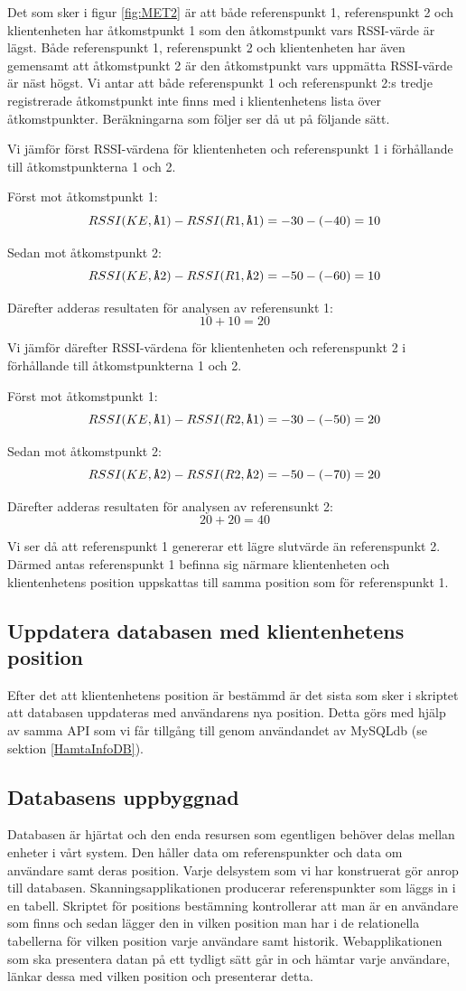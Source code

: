 \documentclass[swedish, a4paper,12pt]{article}
\begin{document}
Det som sker i figur \ref{fig:MET2} är att både referenspunkt 1, referenspunkt 2 och klientenheten har åtkomstpunkt 1 som den åtkomstpunkt vars RSSI-värde är lägst.
Både referenspunkt 1, referenspunkt 2 och klientenheten har även gemensamt att åtkomstpunkt 2 är den åtkomstpunkt vars uppmätta RSSI-värde är näst högst.
Vi antar att både referenspunkt 1 och referenspunkt 2:s tredje registrerade åtkomstpunkt inte finns med i klientenhetens lista över åtkomstpunkter.
Beräkningarna som följer ser då ut på följande sätt.

Vi jämför först RSSI-värdena för klientenheten och referenspunkt 1 i förhållande till åtkomstpunkterna 1 och 2.

Först mot åtkomstpunkt 1: $$ RSSI (KE,\verb|Å|1)  -  RSSI (R1,\verb|Å|1) = -30 - (- 40) = 10 $$

Sedan mot åtkomstpunkt 2: $$ RSSI (KE,\verb|Å|2)  -  RSSI (R1,\verb|Å|2) = -50 - (- 60) = 10 $$

Därefter adderas resultaten för analysen av referensunkt 1: $$ 10 + 10 = 20$$

Vi jämför därefter RSSI-värdena för klientenheten och referenspunkt 2 i förhållande till åtkomstpunkterna 1 och 2.

Först mot åtkomstpunkt 1: $$ RSSI (KE,\verb|Å|1)  -  RSSI (R2,\verb|Å|1) = -30 - (- 50) = 20 $$

Sedan mot åtkomstpunkt 2: $$ RSSI (KE,\verb|Å|2)  -  RSSI (R2,\verb|Å|2) = -50 - (- 70) = 20 $$

Därefter adderas resultaten för analysen av referensunkt 2: $$ 20 + 20 = 40$$

Vi ser då att referenspunkt 1 genererar ett lägre slutvärde än referenspunkt 2. Därmed antas referenspunkt 1 befinna sig närmare klientenheten och klientenhetens position uppskattas till samma position som för referenspunkt 1.

\subsection{Uppdatera databasen med klientenhetens position}
Efter det att klientenhetens position är bestämmd är det sista som sker i skriptet att databasen uppdateras med användarens nya position. Detta görs med hjälp av samma API som vi får tillgång till genom användandet av MySQLdb (se sektion \ref{HamtaInfoDB}).

\subsection{Databasens uppbyggnad}\label{databasen}
Databasen är hjärtat och den enda resursen som egentligen behöver delas mellan enheter i vårt system. Den håller data om referenspunkter och data om användare samt deras position.
Varje delsystem som vi har konstruerat gör anrop till databasen. Skanningsapplikationen producerar referenspunkter som läggs in i en tabell. Skriptet för positions bestämning kontrollerar att man är en användare som finns och sedan lägger den in vilken position man har i de relationella tabellerna för vilken position varje användare samt historik. Webapplikationen som ska presentera datan på ett tydligt sätt går in och hämtar varje användare, länkar dessa med vilken position och presenterar detta.
\end{document}
